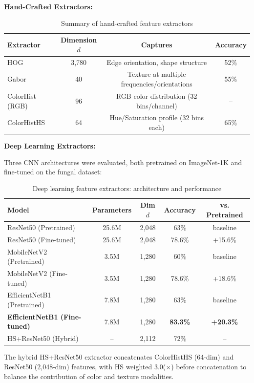 \textbf{Hand-Crafted Extractors:}

\begin{table}[h]
\centering
\caption{Summary of hand-crafted feature extractors}
\begin{tabular}{@{}lccc@{}}
\toprule
\textbf{Extractor} & \textbf{Dimension} \(d\) & \textbf{Captures} & \textbf{Accuracy} \\
\midrule
HOG & 3,780 & Edge orientation, shape structure & 52\% \\
Gabor & 40 & Texture at multiple frequencies/orientations & 55\% \\
ColorHist (RGB) & 96 & RGB color distribution (32 bins/channel) & -- \\
ColorHistHS & 64 & Hue/Saturation profile (32 bins each) & 65\% \\
\bottomrule
\end{tabular}
\end{table}

\textbf{Deep Learning Extractors:}

Three CNN architectures were evaluated, both pretrained on ImageNet-1K and fine-tuned on the fungal dataset:

\begin{table}[h]
\centering
\caption{Deep learning feature extractors: architecture and performance}
\begin{tabular}{@{}lcccc@{}}
\toprule
\textbf{Model} & \textbf{Parameters} & \textbf{Dim} \(d\) & \textbf{Accuracy} & \textbf{vs. Pretrained} \\
\midrule
ResNet50 (Pretrained) & 25.6M & 2,048 & 63\% & baseline \\
ResNet50 (Fine-tuned) & 25.6M & 2,048 & 78.6\% & +15.6\% \\
MobileNetV2 (Pretrained) & 3.5M & 1,280 & 60\% & baseline \\
MobileNetV2 (Fine-tuned) & 3.5M & 1,280 & 78.6\% & +18.6\% \\
EfficientNetB1 (Pretrained) & 7.8M & 1,280 & 63\% & baseline \\
\textbf{EfficientNetB1 (Fine-tuned)} & 7.8M & 1,280 & \textbf{83.3\%} & \textbf{+20.3\%} \\
HS+ResNet50 (Hybrid) & -- & 2,112 & 72\% & -- \\
\bottomrule
\end{tabular}
\end{table}

The hybrid HS+ResNet50 extractor concatenates ColorHistHS (64-dim) and ResNet50 (2,048-dim) features, with HS weighted 3.0($\times$) before concatenation to balance the contribution of color and texture modalities.

